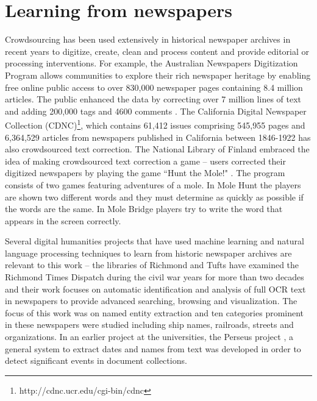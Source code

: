 \documentclass[letterpaper,11pt]{report}
\begin{document}
\section{Learning from newspapers}

Crowdsourcing has been used extensively in historical newspaper archives in recent years to 
digitize, create, clean and process content and provide editorial or processing interventions. For example, the Australian Newspapers Digitization Program \cite{ADNP} allows communities to explore their rich newspaper heritage by enabling free online public access to over 830,000 newspaper pages containing 8.4 million articles. The public enhanced the data by correcting over 7 million lines of text and adding 200,000 tags and 4600 comments \cite{holley_09,holley_09a,Holley_10,Holley10a}. The California Digital Newspaper Collection (CDNC)\footnote{http://cdnc.ucr.edu/cgi-bin/cdnc}, which contains 61,412 issues comprising 545,955 pages and 6,364,529 articles from newspapers published in California between 1846-1922 has also crowdsourced text correction. The National Library of Finland embraced the idea of making crowdsourced text correction a game -- users corrected their digitized newspapers by playing the game ``Hunt the Mole!" \cite{chrons_11}. The program consists of two games featuring adventures of a mole. In Mole Hunt the players are shown two different words and they must determine as quickly as possible if the words are the same. In Mole Bridge players try to write the word that appears in the screen correctly. 

Several digital humanities projects that have used machine learning and natural language processing techniques to learn from historic newspaper archives are relevant to this work -- the libraries of Richmond and Tufts have examined the Richmond Times Dispatch during the civil war years for more than two decades and their work focuses on automatic identification and analysis of full OCR text in newspapers to provide advanced searching, browsing and visualization\cite{crane2006challenge}. The focus of this work was on named entity extraction and ten categories prominent in these newspapers were studied including ship names, railroads, streets and organizations. In an earlier project at the universities, the Perseus project \cite{smith2002detectinga, smith2002detectingb, smith2001disambiguating}, a general system to extract dates and names from text was developed in order to detect significant events in document collections. 
\end{document}
